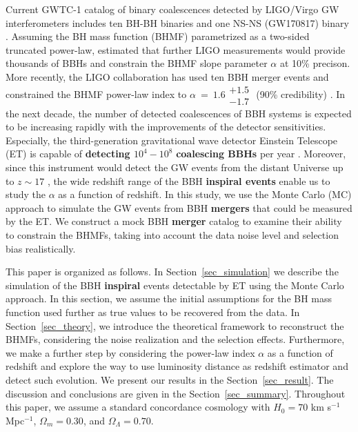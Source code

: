 \documentclass[twocolumn]{aastex62}
\begin{document}
Current GWTC-1 catalog of binary coalescences detected by LIGO/Virgo GW interferometers includes ten BH-BH binaries and one NS-NS (GW170817) binary \citep{Abbott2018}.  Assuming the BH mass function (BHMF) parametrized as a two-sided truncated power-law, \citet{Kovetz2017PhRvD} estimated that further LIGO measurements would provide thousands of BBHs and constrain the BHMF slope parameter $\alpha$ at 10\% precison. More recently, the LIGO collaboration has used ten BBH merger events and constrained the BHMF power-law index to $\alpha~=~1.6\substack{+1.5\\-1.7}$ (90\% credibility) \citep{Abbott2018b}. 
In the next decade, the number of detected coalescences of BBH systems is expected to be increasing rapidly with the improvements of the detector sensitivities. Especially, the third-generation gravitational wave detector Einstein Telescope (ET) is capable of \textbf{detecting $10^4-10^8$} \textbf{coalescing BBHs} per year \citep{Abernathy2011}. Moreover, since this instrument would detect the GW events from the distant Universe up to $z\sim17$ \citep{Abernathy2011}, the wide redshift range of the BBH \textbf{inspiral events} enable us to study the $\alpha$ as a function of redshift. In this study, we use the Monte Carlo (MC) approach to simulate the GW events from BBH \textbf{mergers} that could be measured by the ET. We construct a mock BBH \textbf{merger} catalog to examine their ability to constrain the BHMFs, taking into account the data noise level and selection bias realistically.

This paper is organized as follows. In Section~\ref{sec_simulation} we describe the simulation of the BBH \textbf{inspiral} events detectable by ET using the Monte Carlo approach. In this section, we assume the initial assumptions for the BH mass function used further as true values to be recovered from the data. In Section~\ref{sec_theory}, we introduce the theoretical framework to reconstruct the BHMFs, considering the noise realization and the selection effects. Furthermore, we make a further step by considering the power-law index $\alpha$ as a function of redshift and explore the way to use luminosity distance as redshift estimator and detect such evolution. We present our results in the Section~\ref{sec_result}. The discussion and conclusions are given in the Section~\ref{sec_summary}. Throughout this paper, we assume a standard concordance cosmology with $H_0= 70$ km s$^{-1}$ Mpc$^{-1}$, $\Omega{_m} = 0.30$, and $\Omega{_\Lambda} = 0.70$.
\end{document}
